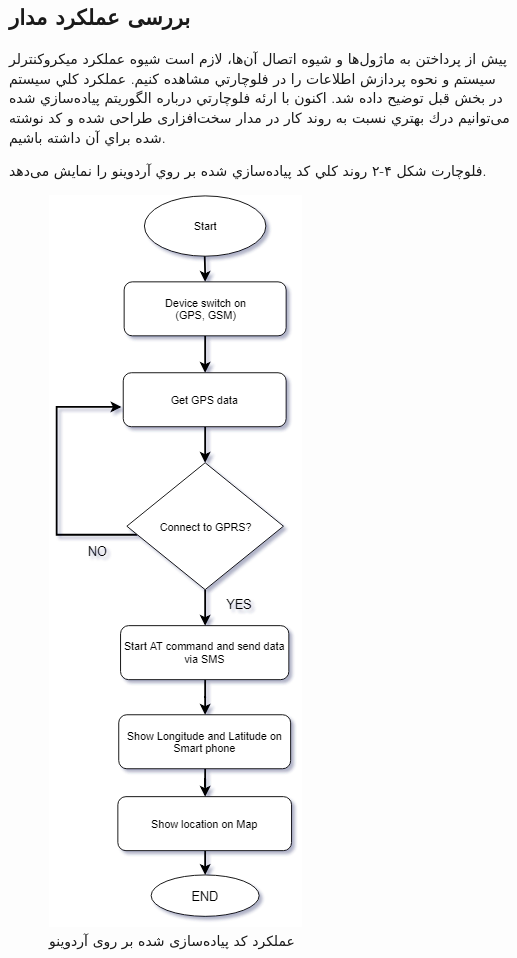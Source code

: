 \subsection{بررسی عملکرد مدار}
پيش از پرداختن به ماژول‌ها و شيوه اتصال آن‌ها، لازم است شيوه عملكرد ميكروكنترلر سيستم و نحوه پردازش اطلاعات را در فلوچارتي مشاهده كنيم. عملكرد كلي سيستم در بخش قبل توضيح داده شد. اكنون با ارئه فلوچارتي درباره الگوريتم پياده‌سازي شده می‌توانیم درك بهتري نسبت به روند كار در مدار سخت‌افزاری طراحی شده و كد نوشته شده براي آن داشته باشيم.

\newpage
فلوچارت شكل ۴-۲ روند كلي كد پياده‌سازي شده بر روي آردوینو را نمايش می‌دهد.
\begin{figure}[h!]
	\centering
	\includegraphics[width=.4\textwidth]{tracking-flowchart}
	\caption{عملکرد کد پیاده‌سازی شده بر روی آردوینو \cite{Rahman2016,Alshamsi,Hazza}}
\end{figure}



